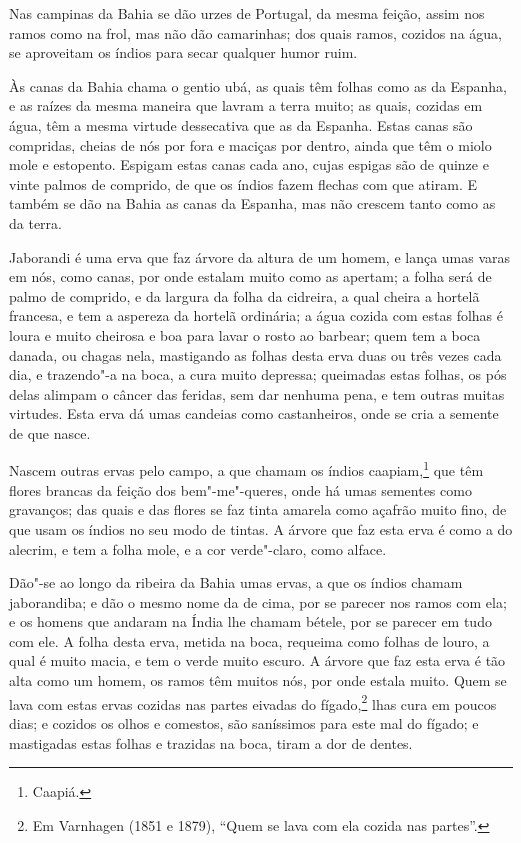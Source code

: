 Nas campinas da Bahia se dão urzes de Portugal, da mesma feição, assim nos ramos como na
frol, mas não dão camarinhas; dos quais ramos, cozidos na água, se aproveitam os índios
para secar qualquer humor ruim.

Às canas da Bahia chama o gentio ubá, as quais têm folhas como as da Espanha, e as raízes
da mesma maneira que lavram a terra muito; as quais, cozidas em água, têm a mesma virtude
dessecativa que as da Espanha. Estas canas são compridas, cheias de nós por fora e maciças
por dentro, ainda que têm o miolo mole e estopento. Espigam estas canas cada ano, cujas
espigas são de quinze e vinte palmos de comprido, de que os índios fazem flechas com que
atiram. E também se dão na Bahia as canas da Espanha, mas não crescem tanto como as da
terra.

Jaborandi é uma erva que faz árvore da altura de um homem, e lança umas varas em nós, como
canas, por onde estalam muito como as apertam; a folha será de palmo de comprido, e da
largura da folha da cidreira, a qual cheira a hortelã francesa, e tem a aspereza da
hortelã ordinária; a água cozida com estas folhas é loura e muito cheirosa e boa para
lavar o rosto ao barbear; quem tem a boca danada, ou chagas nela, mastigando as folhas
desta erva duas ou três vezes cada dia, e trazendo"-a na boca, a cura muito depressa;
queimadas estas folhas, os pós delas alimpam o câncer das feridas, sem dar nenhuma pena, e
tem outras muitas virtudes. Esta erva dá umas candeias como castanheiros, onde se cria a
semente de que nasce.

Nascem outras ervas pelo campo, a que chamam os índios caapiam,\footnote{ Caapiá.} que têm
flores brancas da feição dos bem"-me"-queres, onde há umas sementes como gravanços; das
quais e das flores se faz tinta amarela como açafrão muito fino, de que usam os índios no
seu modo de tintas. A árvore que faz esta erva é como a do alecrim, e tem a folha mole, e
a cor verde"-claro, como alface.

Dão"-se ao longo da ribeira da Bahia umas ervas, a que os índios chamam jaborandiba; e dão
o mesmo nome da de cima, por se parecer nos ramos com ela; e os homens que andaram na
Índia lhe chamam bétele, por se parecer em tudo com ele. A folha desta erva, metida na
boca, requeima como folhas de louro, a qual é muito macia, e tem o verde muito escuro. A
árvore que faz esta erva é tão alta como um homem, os ramos têm muitos nós, por onde
estala muito. Quem se lava com estas ervas cozidas nas partes eivadas do fígado,\footnote{
Em Varnhagen (1851 e 1879), ``Quem se lava com ela cozida nas partes''.} lhas cura em
poucos dias; e cozidos os olhos e comestos, são saníssimos para este mal do fígado; e
mastigadas estas folhas e trazidas na boca, tiram a dor de dentes.

